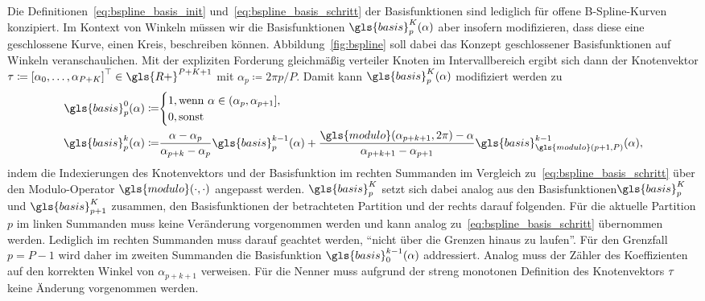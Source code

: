 Die Definitionen~\eqref{eq:bspline_basis_init} und~\eqref{eq:bspline_basis_schritt} der Basisfunktionen sind lediglich für offene B-Spline-Kurven konzipiert.
Im Kontext von Winkeln müssen wir die Basisfunktionen $\gls{basis}_p^K\left(\alpha\right)$ aber insofern modifizieren, dass diese eine geschlossene Kurve, \dhe{} einen Kreis, beschreiben können.
Abbildung~\ref{fig:bspline} soll dabei das Konzept geschlossener Basisfunktionen auf Winkeln veranschaulichen.
Mit der expliziten Forderung gleichmäßig verteiler Knoten im Intervallbereich ergibt sich dann der Knotenvektor $\ve{\tau} \coloneqq {\left[\alpha_0, \ldots, \alpha_{P+K}\right]}^{\top} \in \gls{R+}^{P+K+1}$ mit $\alpha_p \coloneqq 2\pi p/P$.
Damit kann $\gls{basis}_p^K\left(\alpha\right)$ modifiziert werden zu
\begin{equation}
\begin{split}
  \gls{basis}_p^0\left(\alpha\right) \coloneqq & \begin{cases}
    1, \text{wenn } \alpha \in \left(\alpha_p, \alpha_{p+1}\right],\\
    0, \text{sonst}
  \end{cases}\\
  \gls{basis}_p^k\left(\alpha\right) \coloneqq & \frac{\alpha - \alpha_p}{\alpha_{p+k} - \alpha_p} \gls{basis}_p^{k-1}\left(\alpha\right) + \frac{\gls{modulo}\left(\alpha_{p+k+1}, 2\pi\right) - \alpha}{\alpha_{p+k+1} - \alpha_{p+1}}\gls{basis}_{\gls{modulo}\left(p+1,P\right)}^{k-1}\left(\alpha\right),
\end{split}
\label{eq:bspline_basis_winkel}
\end{equation}
indem die Indexierungen des Knotenvektors und der Basisfunktion im rechten Summanden im Vergleich zu~\eqref{eq:bspline_basis_schritt} über den Modulo-Operator $\gls{modulo}\left(\cdot,\cdot\right)$ angepasst werden.
$\gls{basis}_p^K$ setzt sich dabei analog aus den Basisfunktionen$\gls{basis}_p^K$ und $\gls{basis}_{p+1}^K$ zusammen, \dhe{} den Basisfunktionen der betrachteten Partition und der rechts darauf folgenden.
Für die aktuelle Partition $p$ im linken Summanden muss keine Veränderung vorgenommen werden und kann analog zu~\eqref{eq:bspline_basis_schritt} übernommen werden.
Lediglich im rechten Summanden muss darauf geachtet werden, \enquote{nicht über die Grenzen hinaus zu laufen}.
Für den Grenzfall $p = P-1$ wird daher im zweiten Summanden die Basisfunktion $\gls{basis}_0^{k-1}\left(\alpha\right)$ addressiert.
Analog muss der Zähler des Koeffizienten auf den korrekten Winkel von $\alpha_{p+k+1}$ verweisen.
Für die Nenner muss aufgrund der streng monotonen Definition des Knotenvektors $\mathbf{\tau}$ keine Änderung vorgenommen werden.

